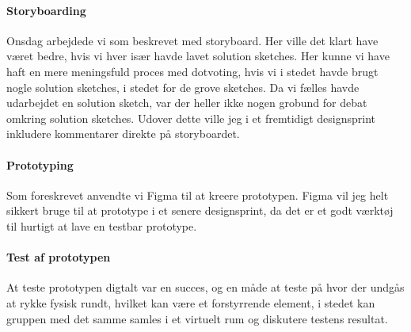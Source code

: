\documentclass{article}
\begin{document}
\paragraph{Storyboarding} Onsdag arbejdede vi som beskrevet med storyboard. Her
ville det klart have været bedre, hvis vi hver især havde lavet solution
sketches. Her kunne vi have haft en mere meningsfuld proces med dotvoting, hvis
vi i stedet havde brugt nogle solution sketches, i stedet for de grove sketches.
Da vi fælles havde udarbejdet en solution sketch, var der heller ikke nogen
grobund for debat omkring solution sketches.  Udover dette ville jeg i et
fremtidigt designsprint inkludere kommentarer direkte på storyboardet.

\paragraph{Prototyping}
Som foreskrevet anvendte vi Figma til at kreere prototypen. Figma vil jeg helt
sikkert bruge til at prototype i et senere designsprint, da det er et godt
værktøj til hurtigt at lave en testbar prototype.

\paragraph{Test af prototypen}
At teste prototypen digtalt var en succes, og en måde at teste på hvor der
undgås at rykke fysisk rundt, hvilket kan være et forstyrrende element, i stedet
kan gruppen med det samme samles i et virtuelt rum og diskutere testens
resultat.
\end{document}
